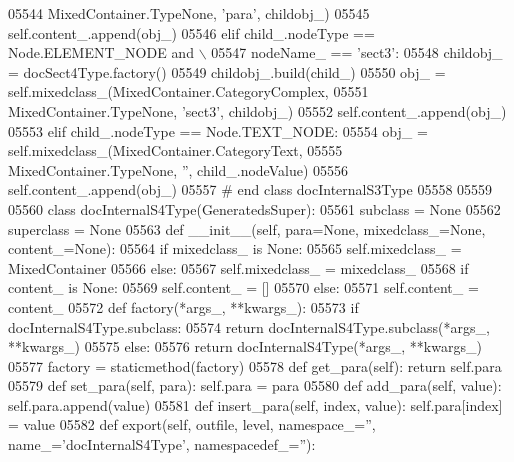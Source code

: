 \begin{DoxyCode}
{{{{{{{{{{{{{{{{{{{{{{{{{{{{{{{{{{{{{{{{{{{{{{{{{{{{{{{{{{{{{{{{{{{{{{{{{{{{{{{{{{{{{{{{{{{{{{{{{{{{{{{{{{{{{{{{{{{{{{{{{{{{{{{{{{{{{{{{{{{{{{{{{{{{{{{{{{{{{{{{{{{{{{{{{{{{{{{{{{{{{{{{{{{{{{{{{{{{{{{{{{{{{{{{{{{{{{{{{{{{{{{{{{{{{{{{{{{{{{{{{{{{{{{{{{{{{{{{{{{{{{{{{{{{{{{{{{{{{{{{{{{{{{{{{{{{{{{{{{{{{{{{{{{{{{{{{{{{{{{{{{{{{{{{{{{{{{{{{{{{{{{{05544                 MixedContainer.TypeNone, \textcolor{stringliteral}{'para'}, childobj\_)
05545             self.content\_.append(obj\_)
05546         \textcolor{keywordflow}{elif} child\_.nodeType == Node.ELEMENT\_NODE \textcolor{keywordflow}{and} \(\backslash\)
05547             nodeName\_ == \textcolor{stringliteral}{'sect3'}:
05548             childobj\_ = docSect4Type.factory()
05549             childobj\_.build(child\_)
05550             obj\_ = self.mixedclass\_(MixedContainer.CategoryComplex,
05551                 MixedContainer.TypeNone, \textcolor{stringliteral}{'sect3'}, childobj\_)
05552             self.content\_.append(obj\_)
05553         \textcolor{keywordflow}{elif} child\_.nodeType == Node.TEXT\_NODE:
05554             obj\_ = self.mixedclass\_(MixedContainer.CategoryText,
05555                 MixedContainer.TypeNone, \textcolor{stringliteral}{''}, child\_.nodeValue)
05556             self.content\_.append(obj\_)
05557 \textcolor{comment}{# end class docInternalS3Type}
05558 
05559 
05560 \textcolor{keyword}{class }docInternalS4Type(GeneratedsSuper):
05561     subclass = \textcolor{keywordtype}{None}
05562     superclass = \textcolor{keywordtype}{None}
05563     \textcolor{keyword}{def }__init__(self, para=None, mixedclass\_=None, content\_=None):
05564         \textcolor{keywordflow}{if} mixedclass\_ \textcolor{keywordflow}{is} \textcolor{keywordtype}{None}:
05565             self.mixedclass_ = MixedContainer
05566         \textcolor{keywordflow}{else}:
05567             self.mixedclass_ = mixedclass\_
05568         \textcolor{keywordflow}{if} content\_ \textcolor{keywordflow}{is} \textcolor{keywordtype}{None}:
05569             self.content_ = []
05570         \textcolor{keywordflow}{else}:
05571             self.content_ = content\_
05572     \textcolor{keyword}{def }factory(*args\_, **kwargs\_):
05573         \textcolor{keywordflow}{if} docInternalS4Type.subclass:
05574             \textcolor{keywordflow}{return} docInternalS4Type.subclass(*args\_, **kwargs\_)
05575         \textcolor{keywordflow}{else}:
05576             \textcolor{keywordflow}{return} docInternalS4Type(*args\_, **kwargs\_)
05577     factory = staticmethod(factory)
05578     \textcolor{keyword}{def }get_para(self): \textcolor{keywordflow}{return} self.para
05579     \textcolor{keyword}{def }set_para(self, para): self.para = para
05580     \textcolor{keyword}{def }add_para(self, value): self.para.append(value)
05581     \textcolor{keyword}{def }insert_para(self, index, value): self.para[index] = value
05582     \textcolor{keyword}{def }export(self, outfile, level, namespace\_='', name\_='docInternalS4Type', namespacedef\_=''):
}}}}}}}}}}}}}}}}}}}}}}}}}}}}}}}}}}}}}}}}}}}}}}}}}}}}}}}}}}}}}}}}}}}}}}}}}}}}}}}}}}}}}}}}}}}}}}}}}}}}}}}}}}}}}}}}}}}}}}}}}}}}}}}}}}}}}}}}}}}}}}}}}}}}}}}}}}}}}}}}}}}}}}}}}}}}}}}}}}}}}}}}}}}}}}}}}}}}}}}}}}}}}}}}}}}}}}}}}}}}}}}}}}}}}}}}}}}}}}}}}}}}}}}}}}}}}}}}}}}}}}}}}}}}}}}}}}}}}}}}}}}}}}}}}}}}}}}}}}}}}}}}}}}}}}}}}}}}}}}}}}}}}}}}}}}}}}}}}}}}}}}}
\end{DoxyCode}
